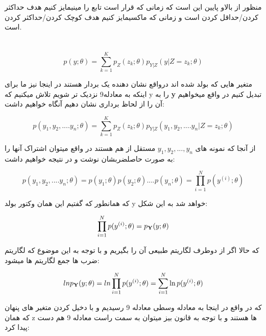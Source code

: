 منظور از بالاو پایین این است که زمانی که قرار است تابع را مینیمایز کنیم هدف حداکثر کردن/حداقل کردن است و زمانی که ماکسیمایز کنیم هدف کوچک کردن/حداکثر کردن است.
\newpage
\huge
\raggedright \section{}
\large

\begin{equation}
p(y; \theta) = \sum_{k=1}^K p_Z(z_k; \theta) p_{Y|Z}(y|Z = z_k; \theta)
\end{equation}
\begin{flushright}
متغیر هایی که بولد شده اند درواقع نشان دهنده یک بردار هستند در اینجا نیز ما برای اینکه به معادله9 نزدیک تر شویم تلاش میکنیم که y را به \textbf y تبدیل کنیم در واقع میخواهیم آن را از لحاظ برداری نشان دهیم آنگاه خواهیم داشت:
\end{flushright}
\begin{equation}
p(y_1 , y_2 , .... y_n ; \theta) = \sum_{k=1}^K p_Z(z_k; \theta) p_{Y|Z}(y_1 , y_2 , .... y_n |Z = z_k; \theta)
\end{equation}
\begin{flushright}
از آنجا که نمونه های $y_1, y_2 , ... ,y_n $ مستقل از هم هستند در واقع میتوان اشتراک آنها را به صورت حاصلضربشان نوشت و در نتیجه خواهیم داشت:
\end{flushright}
\begin{equation}
p(y_1 , y_2 , .... y_n ; \theta) = p(y_1  ; \theta) p(y_2  ; \theta)  .... p(y_n  ; \theta) = \prod_{i=1}^N p(y^{(i)}  ; \theta)
\end{equation}
\begin{flushright}
که همانطور که گفتیم این همان وکتور بولد y خواهد شد به این شکل:
\end{flushright}
\begin{equation}
 \prod_{i=1}^N p(y^{(i)}  ; \theta) =  p_{\textbf Y}(y  ; \theta)
\end{equation}
\begin{flushright}
که حالا اگر از دوطرف لگاریتم طبیعی آن را بگیریم و با توجه به این موضوع که لگاریتم ضرب ها جمع لگاریتم ها میشود:
\end{flushright}
\begin{equation}
ln p_{\textbf Y}(y  ; \theta) =ln \prod_{i=1}^N p(y^{(i)}  ; \theta) = \sum_{i=1}^N \ln p(y^{(i)}  ; \theta) 
\end{equation}
\begin{flushright}
که در واقع در اینجا به معادله وسطی معادله 9 رسیدیم و با دخیل کردن متغیر های پنهان که همان z ها هستند و با توجه به قانون بیز میتوان به سمت راست معادله 9 هم دست پیدا کرد:
\end{flushright}
